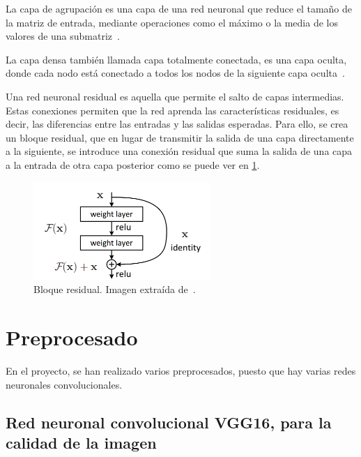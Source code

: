      La capa de agrupación es una capa de una red neuronal que reduce el tamaño de la matriz de entrada, mediante operaciones como el máximo o la media de los valores de una submatriz~\cite{definicion_pooling}.

     La capa densa también llamada capa totalmente conectada, es una capa oculta, donde cada nodo está conectado a todos los nodos de la siguiente capa oculta~\cite{definicion_fully_connected_layer}.
     
    Una red neuronal residual es aquella que permite el salto de capas intermedias. Estas conexiones permiten que la red aprenda las características residuales, es decir, las diferencias entre las entradas y las salidas esperadas.  Para ello, se crea un bloque residual, que en lugar de transmitir la salida de una capa directamente a la siguiente, se introduce una conexión residual que suma la salida de una capa a la entrada de otra capa posterior como se puede ver en \ref{fig:residual-block}.

\begin{figure}[!ht]
         \centering
         \includegraphics[width=0.6\textwidth]{img/residual-block.png}
         \caption{Bloque residual. Imagen extraída de~\cite{DBLP:journals/corr/HeZRS15}.}
         \label{fig:residual-block}
\end{figure}
\section{Preprocesado}
En el proyecto, se han realizado varios preprocesados, puesto que hay varias redes neuronales convolucionales.

\subsection{Red neuronal convolucional VGG16, para la calidad de la imagen}

